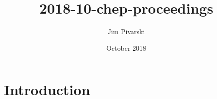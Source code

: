 \documentclass{article}
\title{2018-10-chep-proceedings}
\author{Jim Pivarski}
\date{October 2018}
\begin{document}
\maketitle

\section{Introduction}
\end{document}
